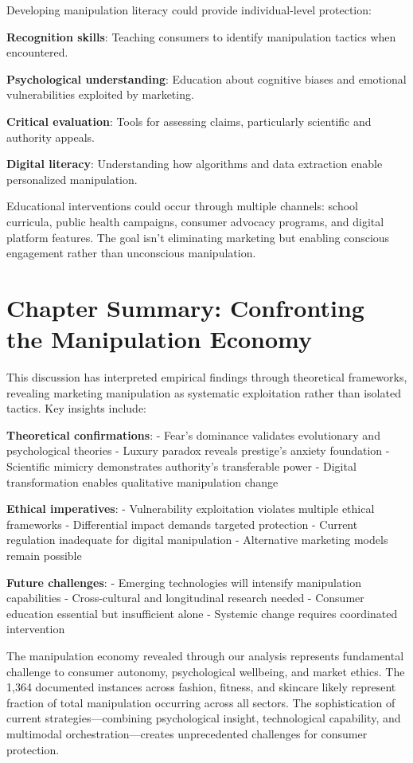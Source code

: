 Developing manipulation literacy could provide individual-level protection:

\textbf{Recognition skills}: Teaching consumers to identify manipulation tactics when encountered.

\textbf{Psychological understanding}: Education about cognitive biases and emotional vulnerabilities exploited by marketing.

\textbf{Critical evaluation}: Tools for assessing claims, particularly scientific and authority appeals.

\textbf{Digital literacy}: Understanding how algorithms and data extraction enable personalized manipulation.

Educational interventions could occur through multiple channels: school curricula, public health campaigns, consumer advocacy programs, and digital platform features. The goal isn't eliminating marketing but enabling conscious engagement rather than unconscious manipulation.

\section{Chapter Summary: Confronting the Manipulation Economy}
\label{sec:discussion_summary}

This discussion has interpreted empirical findings through theoretical frameworks, revealing marketing manipulation as systematic exploitation rather than isolated tactics. Key insights include:

\textbf{Theoretical confirmations}:
- Fear's dominance validates evolutionary and psychological theories
- Luxury paradox reveals prestige's anxiety foundation
- Scientific mimicry demonstrates authority's transferable power
- Digital transformation enables qualitative manipulation change

\textbf{Ethical imperatives}:
- Vulnerability exploitation violates multiple ethical frameworks
- Differential impact demands targeted protection
- Current regulation inadequate for digital manipulation
- Alternative marketing models remain possible

\textbf{Future challenges}:
- Emerging technologies will intensify manipulation capabilities
- Cross-cultural and longitudinal research needed
- Consumer education essential but insufficient alone
- Systemic change requires coordinated intervention

The manipulation economy revealed through our analysis represents fundamental challenge to consumer autonomy, psychological wellbeing, and market ethics. The 1,364 documented instances across fashion, fitness, and skincare likely represent fraction of total manipulation occurring across all sectors. The sophistication of current strategies—combining psychological insight, technological capability, and multimodal orchestration—creates unprecedented challenges for consumer protection.

